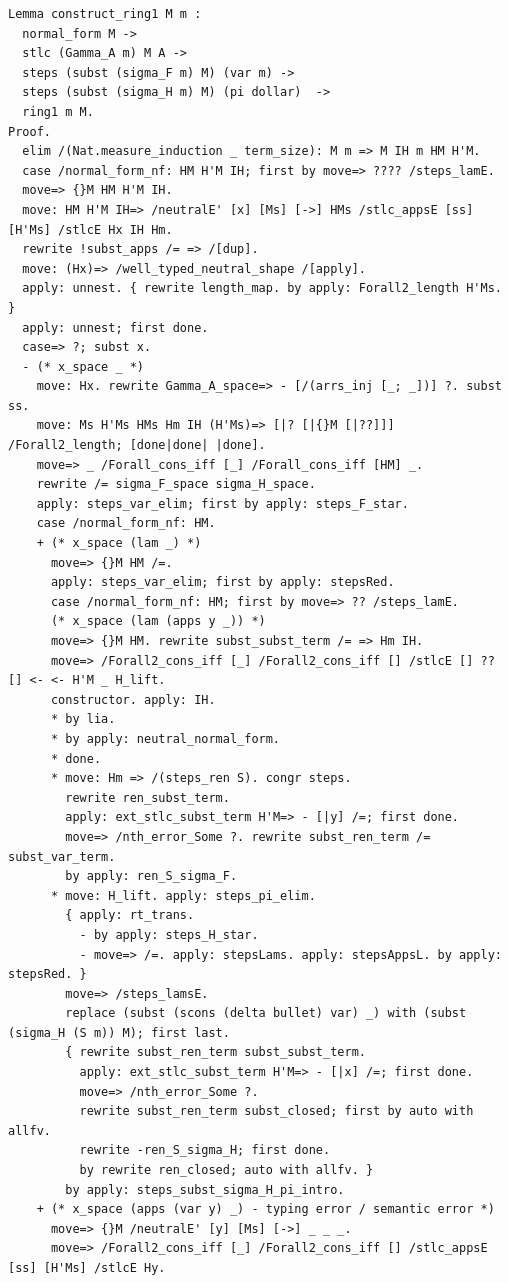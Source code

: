 \documentclass[10pt,a4paper]{amsart}
\begin{document}
\begin{lstlisting}
Lemma construct_ring1 M m :
  normal_form M ->
  stlc (Gamma_A m) M A ->
  steps (subst (sigma_F m) M) (var m) ->
  steps (subst (sigma_H m) M) (pi dollar)  ->
  ring1 m M.
Proof.
  elim /(Nat.measure_induction _ term_size): M m => M IH m HM H'M.
  case /normal_form_nf: HM H'M IH; first by move=> ???? /steps_lamE.
  move=> {}M HM H'M IH.
  move: HM H'M IH=> /neutralE' [x] [Ms] [->] HMs /stlc_appsE [ss] [H'Ms] /stlcE Hx IH Hm.
  rewrite !subst_apps /= => /[dup].
  move: (Hx)=> /well_typed_neutral_shape /[apply].
  apply: unnest. { rewrite length_map. by apply: Forall2_length H'Ms. }
  apply: unnest; first done.
  case=> ?; subst x.
  - (* x_space _ *)
    move: Hx. rewrite Gamma_A_space=> - [/(arrs_inj [_; _])] ?. subst ss.
    move: Ms H'Ms HMs Hm IH (H'Ms)=> [|? [|{}M [|??]]] /Forall2_length; [done|done| |done].
    move=> _ /Forall_cons_iff [_] /Forall_cons_iff [HM] _.
    rewrite /= sigma_F_space sigma_H_space.
    apply: steps_var_elim; first by apply: steps_F_star.
    case /normal_form_nf: HM.
    + (* x_space (lam _) *)
      move=> {}M HM /=.
      apply: steps_var_elim; first by apply: stepsRed.
      case /normal_form_nf: HM; first by move=> ?? /steps_lamE.
      (* x_space (lam (apps y _)) *)
      move=> {}M HM. rewrite subst_subst_term /= => Hm IH.
      move=> /Forall2_cons_iff [_] /Forall2_cons_iff [] /stlcE [] ?? [] <- <- H'M _ H_lift.
      constructor. apply: IH.
      * by lia.
      * by apply: neutral_normal_form.
      * done.
      * move: Hm => /(steps_ren S). congr steps.
        rewrite ren_subst_term.
        apply: ext_stlc_subst_term H'M=> - [|y] /=; first done.
        move=> /nth_error_Some ?. rewrite subst_ren_term /= subst_var_term.
        by apply: ren_S_sigma_F.
      * move: H_lift. apply: steps_pi_elim.
        { apply: rt_trans.
          - by apply: steps_H_star.
          - move=> /=. apply: stepsLams. apply: stepsAppsL. by apply: stepsRed. }
        move=> /steps_lamsE.
        replace (subst (scons (delta bullet) var) _) with (subst (sigma_H (S m)) M); first last.
        { rewrite subst_ren_term subst_subst_term.
          apply: ext_stlc_subst_term H'M=> - [|x] /=; first done.
          move=> /nth_error_Some ?.
          rewrite subst_ren_term subst_closed; first by auto with allfv.
          rewrite -ren_S_sigma_H; first done.
          by rewrite ren_closed; auto with allfv. }
        by apply: steps_subst_sigma_H_pi_intro.
    + (* x_space (apps (var y) _) - typing error / semantic error *)
      move=> {}M /neutralE' [y] [Ms] [->] _ _ _.
      move=> /Forall2_cons_iff [_] /Forall2_cons_iff [] /stlc_appsE [ss] [H'Ms] /stlcE Hy.

\end{lstlisting}
\end{document}
